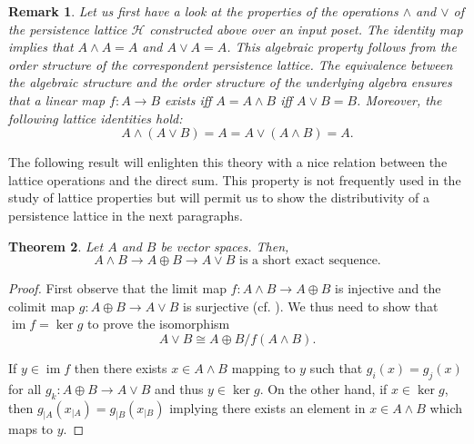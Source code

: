 \documentclass[10pt]{amsart}
\newtheorem{theorem}{Theorem}[section]
\newtheorem{remark}[theorem]{Remark}
\def \HH{{\mathcal H}}
\DeclareMathOperator{\im}{im}
\begin{document}
\begin{remark}
Let us first have a look at the properties of the operations $\wedge$ and $\vee$ of the persistence lattice $\HH$ constructed above over an input poset. 
The identity map implies that $A\wedge A=A$ and $A\vee A=A$. 
This algebraic property follows from the order structure of the correspondent persistence lattice. 
The equivalence between the algebraic structure and the order structure of the underlying algebra ensures that a linear map $f:A\rightarrow B$ exists iff $A=A\wedge B$ iff $A\vee B=B$. 
Moreover, the following lattice identities hold:
\[
A\wedge (A\vee B)=A=A\vee (A\wedge B)=A.
\]


\end{remark}



The following result will enlighten this theory with a nice relation between the lattice operations and the direct sum. This property is not frequently used in the study of lattice properties but will permit us to show the distributivity of a persistence lattice in the next paragraphs.

\begin{theorem}\label{ses}
Let $A$ and $B$ be vector spaces. Then, \[
A\wedge B\rightarrow A\oplus B\rightarrow A\vee B \text{  is a short exact sequence.}
\]
\end{theorem}

\begin{proof}
First observe that the limit map $f:A\wedge B\rightarrow A\oplus B$ is injective and the colimit map $g:A\oplus B\rightarrow A\vee B$ is surjective (cf. \cite{La98}).
We thus need to show that $\im f=\ker g$ to prove the isomorphism 
\[
A\vee B\cong A\oplus B/f(A\wedge B).
\]

If $y\in \im f$ then there exists $x\in A\wedge B$ mapping to $y$ such that $g_{i}(x)=g_{j}(x)$ for all $g_{k}:A\oplus B\rightarrow A\vee B$ and thus $y\in \ker g$.
On the other hand, if $x\in \ker g$, then $g_{|A}(x_{|A}) = g_{|B}(x_{|B})$ implying there exists an element in $x\in A\wedge B$ which maps to $y$.

\end{proof}
\end{document}
